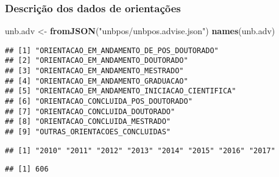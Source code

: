 \documentclass[]{article}
\newenvironment{Shaded}{\begin{snugshade}}{\end{snugshade}}
\newcommand{\KeywordTok}[1]{\textcolor[rgb]{0.13,0.29,0.53}{\textbf{#1}}}
\newcommand{\DataTypeTok}[1]{\textcolor[rgb]{0.13,0.29,0.53}{#1}}
\newcommand{\DecValTok}[1]{\textcolor[rgb]{0.00,0.00,0.81}{#1}}
\newcommand{\StringTok}[1]{\textcolor[rgb]{0.31,0.60,0.02}{#1}}
\newcommand{\OtherTok}[1]{\textcolor[rgb]{0.56,0.35,0.01}{#1}}
\newcommand{\OperatorTok}[1]{\textcolor[rgb]{0.81,0.36,0.00}{\textbf{#1}}}
\newcommand{\NormalTok}[1]{#1}
\begin{document}
\subsubsection{Descrição dos dados de
orientações}\label{descricao-dos-dados-de-orientacoes}

\begin{Shaded}
\begin{Highlighting}[]
\NormalTok{unb.adv <-}\StringTok{ }\KeywordTok{fromJSON}\NormalTok{(}\StringTok{"unbpos/unbpos.advise.json"}\NormalTok{)}
\KeywordTok{names}\NormalTok{(unb.adv)}
\end{Highlighting}
\end{Shaded}

\begin{verbatim}
## [1] "ORIENTACAO_EM_ANDAMENTO_DE_POS_DOUTORADO"    
## [2] "ORIENTACAO_EM_ANDAMENTO_DOUTORADO"           
## [3] "ORIENTACAO_EM_ANDAMENTO_MESTRADO"            
## [4] "ORIENTACAO_EM_ANDAMENTO_GRADUACAO"           
## [5] "ORIENTACAO_EM_ANDAMENTO_INICIACAO_CIENTIFICA"
## [6] "ORIENTACAO_CONCLUIDA_POS_DOUTORADO"          
## [7] "ORIENTACAO_CONCLUIDA_DOUTORADO"              
## [8] "ORIENTACAO_CONCLUIDA_MESTRADO"               
## [9] "OUTRAS_ORIENTACOES_CONCLUIDAS"
\end{verbatim}

\begin{Shaded}
\end{Shaded}

\begin{verbatim}
## [1] "2010" "2011" "2012" "2013" "2014" "2015" "2016" "2017"
\end{verbatim}

\begin{Shaded}
\end{Shaded}

\begin{verbatim}
## [1] 606
\end{verbatim}

\begin{Shaded}
\end{Shaded}
\end{document}
